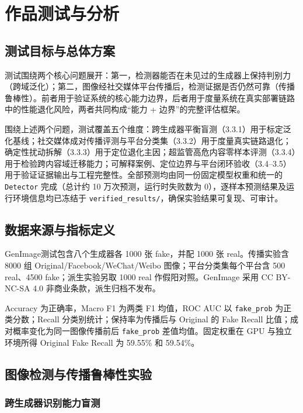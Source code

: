 \documentclass[UTF8, a4paper, 12pt]{ctexart}
\begin{document}
\section{作品测试与分析}

\subsection{测试目标与总体方案}

测试围绕两个核心问题展开：第一，检测器能否在未见过的生成器上保持判别力（跨域泛化）；第二，图像经社交媒体平台传播后，检测证据是否仍然可靠（传播鲁棒性）。前者用于验证系统的核心能力边界，后者用于度量系统在真实部署链路中的性能退化风险，两者共同构成``能力 + 边界''的完整评估框架。

围绕上述两个问题，测试覆盖五个维度：跨生成器平衡盲测（3.3.1）用于标定泛化基线；社交媒体成对传播评测与平台分类集（3.3.2）用于度量真实链路退化；确定性扰动拆解（3.3.3）用于定位退化主因；超监管高危内容零样本评测（3.3.4）用于检验跨内容域迁移能力；可解释案例、定位边界与平台闭环验收（3.4--3.5）用于验证证据输出与工程完整性。全部预测均由同一份固定模型权重和统一的 \texttt{Detector} 完成（总计约 10 万次预测，运行时失败数为 0），逐样本预测结果及运行环境信息均已冻结于 \texttt{verified\_results/}，确保实验结果可复现、可审计。

\subsection{数据来源与指标定义}

GenImage\cite{zhu2023genimage}测试包含八个生成器各 1000 张 fake，并配 1000 张 real。传播实验含 8000 组 Original/Facebook/WeChat/Weibo 图像；平台分类集每个平台含 500 real、4500 fake；派生实验另取 1000 real 作假阳对照。GenImage 采用 CC BY-NC-SA 4.0 非商业条款\cite{genimage2023license}，派生归档不发布。

Accuracy 为正确率，Macro F1 为两类 F1 均值，ROC AUC 以 \texttt{fake\_prob} 为正类分数；Recall 分类别统计；保持率为传播后与 Original 的 Fake Recall 比值；成对概率变化为同一图像传播前后 \texttt{fake\_prob} 差值均值。固定权重在 GPU 与独立环境所得 Original Fake Recall 为 59.55\% 和 59.54\%。

\subsection{图像检测与传播鲁棒性实验}

\subsubsection{跨生成器识别能力盲测}
\end{document}
